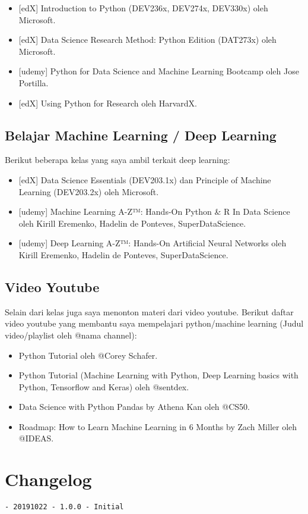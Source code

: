 \documentclass[11pt]{article}
\providecommand{\tightlist}{%
      \setlength{\itemsep}{0pt}\setlength{\parskip}{0pt}}
\begin{document}
\begin{itemize}
\tightlist
\item
  {[}edX{]} Introduction to Python (DEV236x, DEV274x, DEV330x) oleh
  Microsoft.
\item
  {[}edX{]} Data Science Research Method: Python Edition (DAT273x) oleh
  Microsoft.
\item
  {[}udemy{]} Python for Data Science and Machine Learning Bootcamp oleh
  Jose Portilla.
\item
  {[}edX{]} Using Python for Research oleh HarvardX.
\end{itemize}

    \hypertarget{belajar-machine-learning-deep-learning}{%
\subsection{Belajar Machine Learning / Deep
Learning}\label{belajar-machine-learning-deep-learning}}

Berikut beberapa kelas yang saya ambil terkait deep learning:

\begin{itemize}
\tightlist
\item
  {[}edX{]} Data Science Essentials (DEV203.1x) dan Principle of Machine
  Learning (DEV203.2x) oleh Microsoft.
\item
  {[}udemy{]} Machine Learning A-Z™: Hands-On Python \& R In Data
  Science oleh Kirill Eremenko, Hadelin de Ponteves, SuperDataScience.
\item
  {[}udemy{]} Deep Learning A-Z™: Hands-On Artificial Neural Networks
  oleh Kirill Eremenko, Hadelin de Ponteves, SuperDataScience.
\end{itemize}

    \hypertarget{video-youtube}{%
\subsection{Video Youtube}\label{video-youtube}}

Selain dari kelas juga saya menonton materi dari video youtube. Berikut
daftar video youtube yang membantu saya mempelajari python/machine
learning (Judul video/playlist oleh @nama channel):

\begin{itemize}
\tightlist
\item
  Python Tutorial oleh @Corey Schafer.
\item
  Python Tutorial (Machine Learning with Python, Deep Learning basics
  with Python, Tensorflow and Keras) oleh @sentdex.
\item
  Data Science with Python Pandas by Athena Kan oleh @CS50.
\item
  Roadmap: How to Learn Machine Learning in 6 Months by Zach Miller oleh
  @IDEAS.
\end{itemize}

    \hypertarget{changelog}{%
\section{Changelog}\label{changelog}}

\begin{verbatim}
- 20191022 - 1.0.0 - Initial
\end{verbatim}


    
    
    
\end{document}
